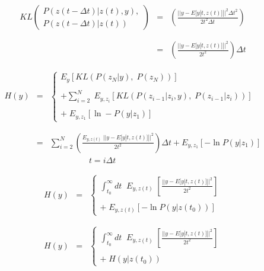 {{\vfill
\begin{eqnarray*}
  KL\left(\begin{array}{l}P(z(t-\Delta t)|z(t),y), \\P(z(t-\Delta  t)|z(t))\end{array}\right)
  & = & \left(\frac{||y-E[y|t,z(t)]||^2\Delta t^2}{2t^2\Delta t}\right) \\
  \\
  \\
  & =  & \left(\frac{||y-E[y|t,z(t)]||^2}{2t^2}\right) \Delta t
\end{eqnarray*}
}

\begin{eqnarray*}
  H(y) & = & \left\{\begin{array}{l} E_y[KL(P(z_N|y),\;P(z_N))] \\ \\ + \sum_{i=2}^N  \; E_{y,z_i}[KL(P(z_{i-1}|z_i,y),\;P(z_{i-1}|z_i))] \\ \\ +\;E_{y,z_1}[\ln -P(y|z_1)] \end{array}\right.
  \\
  \\
  \\
  & = & \sum_{i = 2}^N  \left(\frac{E_{y,z(t)}\;||y-E[y|t,z(t)]||^2}{2t^2}\right) \Delta t + E_{y,z_1}[- \ln P(y|z_1)] \\
  & & \;\;\;\;\;\;\;\;\;\;\;\;\;\;\;\;\;t = i\Delta t
\end{eqnarray*}


\begin{eqnarray*}
H(y) & = & \left\{\begin{array}{l}\int_{t_0}^\infty dt \;\; E_{y,z(t)}\;\left[\frac{||y - E[y|t,z(t)]||^2}{2t^2}\right] \\ \\ + \;E_{y,z(t)}[-\ln P(y|z(t_0))]\end{array}\right. \\
\\
\\
  H(y) & = & \left\{\begin{array}{l}\int_{t_0}^\infty dt \;\; E_{y,z(t)}\;\left[\frac{||y - E[y|t,z(t)]||^2}{2t^2}\right] \\ \\ +\;H(y|z(t_0))\end{array}\right.
\end{eqnarray*}

}
